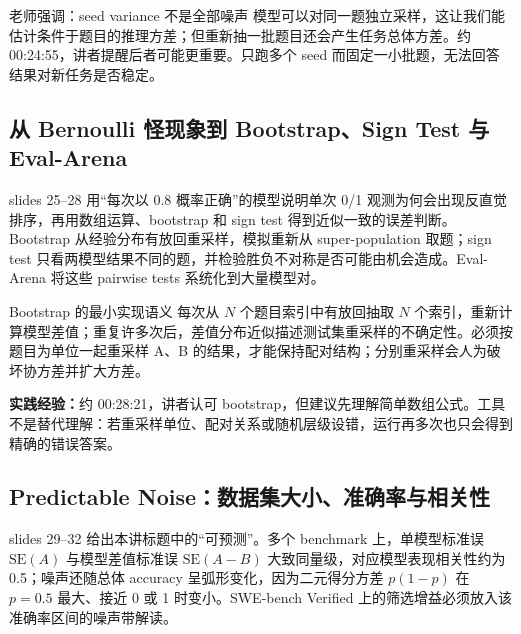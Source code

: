 \begin{knowledgebox}{老师强调：seed variance 不是全部噪声}
模型可以对同一题独立采样，这让我们能估计条件于题目的推理方差；但重新抽一批题目还会产生任务总体方差。约 00:24:55，讲者提醒后者可能更重要。只跑多个 seed 而固定一小批题，无法回答结果对新任务是否稳定。
\end{knowledgebox}

\subsection{从 Bernoulli 怪现象到 Bootstrap、Sign Test 与 Eval-Arena}

slides 25--28 用“每次以 0.8 概率正确”的模型说明单次 0/1 观测为何会出现反直觉排序，再用数组运算、bootstrap 和 sign test 得到近似一致的误差判断。Bootstrap 从经验分布有放回重采样，模拟重新从 super-population 取题；sign test 只看两模型结果不同的题，并检验胜负不对称是否可能由机会造成。Eval-Arena 将这些 pairwise tests 系统化到大量模型对。


\begin{importantbox}{Bootstrap 的最小实现语义}
每次从 $N$ 个题目索引中有放回抽取 $N$ 个索引，重新计算模型差值；重复许多次后，差值分布近似描述测试集重采样的不确定性。必须按题目为单位一起重采样 A、B 的结果，才能保持配对结构；分别重采样会人为破坏协方差并扩大方差。
\end{importantbox}

\textbf{实践经验：}约 00:28:21，讲者认可 bootstrap，但建议先理解简单数组公式。工具不是替代理解：若重采样单位、配对关系或随机层级设错，运行再多次也只会得到精确的错误答案。

\subsection{Predictable Noise：数据集大小、准确率与相关性}

slides 29--32 给出本讲标题中的“可预测”。多个 benchmark 上，单模型标准误 $\mathrm{SE}(A)$ 与模型差值标准误 $\mathrm{SE}(A-B)$ 大致同量级，对应模型表现相关性约为 0.5；噪声还随总体 accuracy 呈弧形变化，因为二元得分方差 $p(1-p)$ 在 $p=0.5$ 最大、接近 0 或 1 时变小。SWE-bench Verified 上的筛选增益必须放入该准确率区间的噪声带解读。

